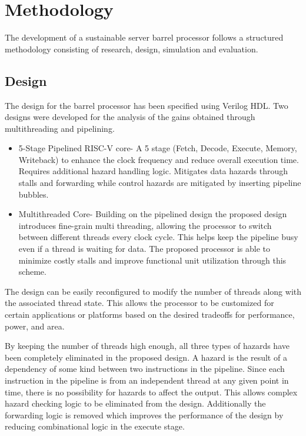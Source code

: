 \documentclass[conference]{IEEEtran}
\begin{document}
\section{Methodology}
The development of a sustainable server barrel processor follows a structured methodology consisting of research, design, simulation and evaluation.

\subsection{Design}
The design for the barrel processor has been specified using Verilog HDL. Two designs were developed for the analysis of the gains obtained through multithreading and pipelining.
\begin{itemize}
    \item 5-Stage Pipelined RISC-V core- A 5 stage (Fetch, Decode, Execute, Memory, Writeback) to enhance the clock frequency and reduce overall execution time. Requires additional hazard handling logic. Mitigates data hazards through stalls and forwarding while control hazards are mitigated by inserting pipeline bubbles.

    \item Multithreaded Core- Building on the pipelined design the proposed design introduces fine-grain multi threading, allowing the processor to switch between different threads every clock cycle. This helps keep the pipeline busy even if a thread is waiting for data. The proposed processor is able to minimize costly stalls and improve functional unit utilization through this scheme.
\end{itemize}

\begin{flushleft}
The design can be easily reconfigured to modify the number of threads along with the associated thread state. This allows the processor to be customized for certain applications or platforms based on the desired tradeoffs for performance, power, and area.
\end{flushleft}

\begin{flushleft}
By keeping the number of threads high enough, all three types of hazards have been completely eliminated in the proposed design. A hazard is the result of a dependency of some kind between two instructions in the pipeline. Since each instruction in the pipeline is from an independent thread at any given point in time, there is no possibility for hazards to affect the output. This allows complex hazard checking logic to be eliminated from the design. Additionally the forwarding logic is removed which improves the performance of the design by reducing combinational logic in the execute stage.
\end{flushleft}
\end{document}
